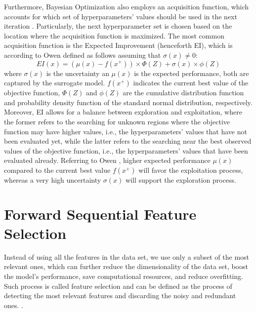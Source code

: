 Furthermore, Bayesian Optimization also employs an acquisition function, which accounts for which set of hyperparameters' values should be used in the next iteration \citep{owen2022hyperparameter}. Particularly, the next hyperparameter set is chosen based on the location where the acquisition function is maximized.
The most common acquisition function is the Expected Improvement (henceforth EI), which is according to Owen \citep{owen2022hyperparameter} defined as follows assuming that $ \sigma\left(x\right) \neq 0$:
\begin{equation}\label{eq}
    EI(x) = \left(\mu\left(x\right) - f\left(x^{+}\right)\right) \times \Phi\left(Z\right) + \sigma\left(x\right) \times \phi\left(Z\right)
\end{equation}
where $\sigma\left(x\right)$ is the uncertainty an $\mu\left(x\right)$ is the expected performance, both are captured by the surrogate model. $f\left(x^{+}\right)$ indicates the current best value of the objective function, $\Phi\left(Z\right)$ and $\phi\left(Z\right)$ are the cumulative distribution function and probability density function of the standard normal distribution, respectively.
Moreover, EI allows for a balance between exploration and exploitation, where the former refers to the searching for unknown regions where the objective function may have higher values, i.e., the hyperparameters' values that have not been evaluated yet, while the latter refers to the searching near the best observed values of the objective function, i.e., the hyperparameters' values that have been evaluated already.
Referring to Owen \citep{owen2022hyperparameter}, higher expected performance $\mu\left(x\right)$ compared to the current best value $f\left(x^{+}\right)$ will favor the exploitation process, whereas a very high uncertainty $\sigma\left(x\right)$ will support the exploration process.

\newpage
\section{Forward Sequential Feature Selection}
\label{sec:fsfstheory}
Instead of using all the features in the data set, we use only a subset of the most relevant ones, which can further reduce the dimensionality of the data set, boost the model's performance, save computational resources, and reduce overfitting. Such process is called feature selection and can be defined as the process of detecting the most relevant features and discarding the noisy and redundant ones. \citep{bolon2015feature}.


